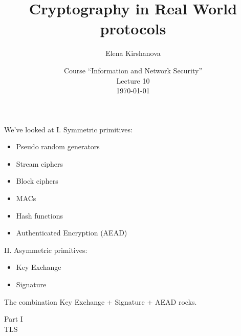 \documentclass[usenames,dvipsnames, 9pt]{beamer}
\author{Elena Kirshanova \\ [10pt]
}
\title{\Huge Cryptography in Real World protocols}
\date{ Course ``Information and Network Security'' \\ 	
	Lecture 10 \\ \today }
\begin{document}
	
\begin{frame}
	\titlepage
\end{frame}

\begin{frame}{We've looked at}
	\Large
	{\color{Orange} I. Symmetric primitives:} \\[5pt]
	\begin{itemize}
		\item Pseudo random generators
		\item Stream ciphers
		\item Block ciphers
		\item MACs
		\item Hash functions
		\item Authenticated Encryption (AEAD)
	\end{itemize} 
\vspace{10pt}
	{\color{Orange} II. Asymmetric primitives:} \\[5pt]
	\begin{itemize}
		\item Key Exchange
		\item Signature
	\end{itemize} 
\vspace{10pt}
\centering
	The combination
	{ \color{Orange} Key Exchange + Signature + AEAD}
	rocks.

\end{frame}


\begin{frame}
Part I \\ [10pt]

\color{Orange}
\Huge TLS

\end{frame}
\end{document}
